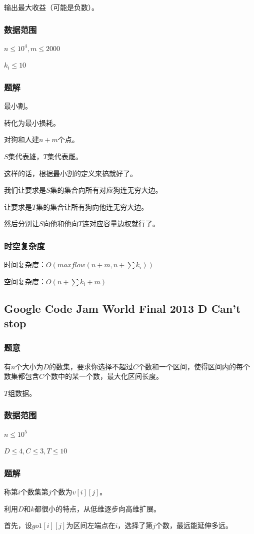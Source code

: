 \documentclass{ctexart}
\begin{document}
输出最大收益（可能是负数）。
\subsubsection{数据范围}
$n \le 10^4,m \le 2000$

$k_i \le 10$
\subsubsection{题解}
最小割。

转化为最小损耗。

对狗和人建$n+m$个点。

$S$集代表雄，$T$集代表雌。

这样的话，根据最小割的定义来搞就好了。

我们让要求是$S$集的集合向所有对应狗连无穷大边。

让要求是$T$集的集合让所有狗向他连无穷大边。

然后分别让$S$向他和他向$T$连对应容量边权就行了。
\subsubsection{时空复杂度}
时间复杂度：$O(maxflow(n+m,n+\sum k_i))$

空间复杂度：$O(n+\sum k_i+m)$
\subsection{Google Code Jam World Final 2013 D Can't stop}
\subsubsection{题意}
有$n$个大小为$D$的数集，要求你选择不超过$C$个数和一个区间，使得区间内的每个数集都包含$C$个数中的某一个数，最大化区间长度。

$T$组数据。
\subsubsection{数据范围}
$n \le 10^5$

$D \le 4,C \le 3,T \le 10$
\subsubsection{题解}
称第$i$个数集第$j$个数为$v[i][j]$。

利用$D$和$k$都很小的特点，从低维逐步向高维扩展。

首先，设$go1[i][j]$为区间左端点在$i$，选择了第$j$个数，最远能延伸多远。
\end{document}
